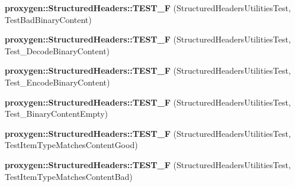 \begin{DoxyCompactItemize}
{\bf proxygen\+::\+Structured\+Headers\+::\+T\+E\+S\+T\+\_\+F} (Structured\+Headers\+Utilities\+Test, Test\+Bad\+Binary\+Content)
\item 
{\bf proxygen\+::\+Structured\+Headers\+::\+T\+E\+S\+T\+\_\+F} (Structured\+Headers\+Utilities\+Test, Test\+\_\+\+Decode\+Binary\+Content)
\item 
{\bf proxygen\+::\+Structured\+Headers\+::\+T\+E\+S\+T\+\_\+F} (Structured\+Headers\+Utilities\+Test, Test\+\_\+\+Encode\+Binary\+Content)
\item 
{\bf proxygen\+::\+Structured\+Headers\+::\+T\+E\+S\+T\+\_\+F} (Structured\+Headers\+Utilities\+Test, Test\+\_\+\+Binary\+Content\+Empty)
\item 
{\bf proxygen\+::\+Structured\+Headers\+::\+T\+E\+S\+T\+\_\+F} (Structured\+Headers\+Utilities\+Test, Test\+Item\+Type\+Matches\+Content\+Good)
\item 
{\bf proxygen\+::\+Structured\+Headers\+::\+T\+E\+S\+T\+\_\+F} (Structured\+Headers\+Utilities\+Test, Test\+Item\+Type\+Matches\+Content\+Bad)
\end{DoxyCompactItemize}
